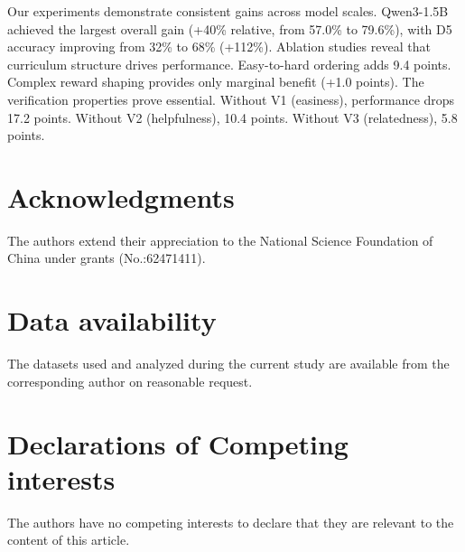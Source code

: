 \documentclass[a4paper,fleqn]{cas-dc}
\theoremstyle{definition}
\begin{document}
Our experiments demonstrate consistent gains across model scales. Qwen3-1.5B achieved the largest overall gain (+40\% relative, from 57.0\% to 79.6\%), with D5 accuracy improving from 32\% to 68\% (+112\%). Ablation studies reveal that curriculum structure drives performance. Easy-to-hard ordering adds 9.4 points. Complex reward shaping provides only marginal benefit (+1.0 points). The verification properties prove essential. Without V1 (easiness), performance drops 17.2 points. Without V2 (helpfulness), 10.4 points. Without V3 (relatedness), 5.8 points.

\section*{Acknowledgments}
 The authors extend their appreciation to the National Science Foundation of China under grants (No.:62471411). 


\section*{Data availability}
The datasets used and analyzed during the current study are available from the corresponding author on reasonable request.

\section*{Declarations of Competing interests}
The authors have no competing interests to declare that they are relevant to the content of this article.



 



















\appendix                                                                               
                                                 

  
\end{document}
